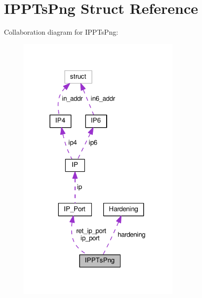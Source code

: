 \hypertarget{struct_i_p_p_ts_png}{\section{I\+P\+P\+Ts\+Png Struct Reference}
\label{struct_i_p_p_ts_png}
}


Collaboration diagram for I\+P\+P\+Ts\+Png\+:
\nopagebreak
\begin{figure}[H]
\begin{center}
\leavevmode
\includegraphics[width=226pt]{struct_i_p_p_ts_png__coll__graph}
\end{center}
\end{figure}

